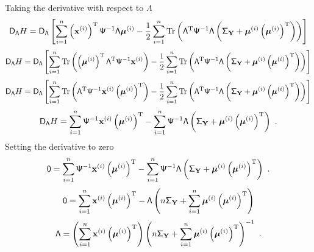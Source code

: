 \documentclass[12pt]{report}
\DeclareMathOperator{\trace}{Tr}
\newcommand{\T}{^\textup{T}}
\newcommand{\vect}[1]{\mathbf{#1}}
\newcommand{\vectGreek}[1]{\boldsymbol{#1}}
\newcommand{\matr}[1]{\mathsf{#1}}
\begin{document}
Taking the derivative with respect to $\matr{\Lambda}$
\begin{equation*}
\matr{D}_{\matr{\Lambda}}H=
\matr{D}_{\matr{\Lambda}}\left[
\sum_{i=1}^n\left(\vect{x}^{(i)}\right)\T\matr{\Psi}^{-1}\matr{\Lambda}\vectGreek{\mu}^{(i)}
-\frac{1}{2}\sum_{i=1}^{n}\trace\left(\matr{\Lambda}\T\matr{\Psi}^{-1}\matr{\Lambda}\left(\matr{\Sigma}_{\vect{Y}}+\vectGreek{\mu}^{(i)}\left(\vectGreek{\mu}^{(i)}\right)\T\right)\right)
\right]
\end{equation*}
\begin{equation*}
\matr{D}_{\matr{\Lambda}}H=
\matr{D}_{\matr{\Lambda}}\left[
\sum_{i=1}^n\trace\left(\left(\vectGreek{\mu}^{(i)}\right)\T\matr{\Lambda}\T\matr{\Psi}^{-1}\vect{x}^{(i)}\right)
-\frac{1}{2}\sum_{i=1}^{n}\trace\left(\matr{\Lambda}\T\matr{\Psi}^{-1}\matr{\Lambda}\left(\matr{\Sigma}_{\vect{Y}}+\vectGreek{\mu}^{(i)}\left(\vectGreek{\mu}^{(i)}\right)\T\right)\right)
\right]
\end{equation*}
\begin{equation*}
\matr{D}_{\matr{\Lambda}}H=
\matr{D}_{\matr{\Lambda}}\left[
\sum_{i=1}^n\trace\left(\matr{\Lambda}\T\matr{\Psi}^{-1}\vect{x}^{(i)}\left(\vectGreek{\mu}^{(i)}\right)\T\right)
-\frac{1}{2}\sum_{i=1}^{n}\trace\left(\matr{\Lambda}\T\matr{\Psi}^{-1}\matr{\Lambda}\left(\matr{\Sigma}_{\vect{Y}}+\vectGreek{\mu}^{(i)}\left(\vectGreek{\mu}^{(i)}\right)\T\right)\right)
\right]
\end{equation*}
\begin{equation*}
\matr{D}_{\matr{\Lambda}}H=
\sum_{i=1}^n\matr{\Psi}^{-1}\vect{x}^{(i)}\left(\vectGreek{\mu}^{(i)}\right)\T
-\sum_{i=1}^{n}\matr{\Psi}^{-1}\matr{\Lambda}\left(\matr{\Sigma}_{\vect{Y}}+\vectGreek{\mu}^{(i)}\left(\vectGreek{\mu}^{(i)}\right)\T\right) \ .
\end{equation*}
Setting the derivative to zero
\begin{equation*}
\matr{0}=
\sum_{i=1}^n\matr{\Psi}^{-1}\vect{x}^{(i)}\left(\vectGreek{\mu}^{(i)}\right)\T
-\sum_{i=1}^{n}\matr{\Psi}^{-1}\matr{\Lambda}\left(\matr{\Sigma}_{\vect{Y}}+\vectGreek{\mu}^{(i)}\left(\vectGreek{\mu}^{(i)}\right)\T\right) \ .
\end{equation*}
\begin{equation*}
\matr{0}=
\sum_{i=1}^n\vect{x}^{(i)}\left(\vectGreek{\mu}^{(i)}\right)\T
-\matr{\Lambda}\left(n\matr{\Sigma}_{\vect{Y}}+\sum_{i=1}^{n}\vectGreek{\mu}^{(i)}\left(\vectGreek{\mu}^{(i)}\right)\T\right)
\end{equation*}
\begin{equation}
\matr{\Lambda}
=
\left(\sum_{i=1}^n\vect{x}^{(i)}\left(\vectGreek{\mu}^{(i)}\right)\T\right)\left(n\matr{\Sigma}_{\vect{Y}}+\sum_{i=1}^{n}\vectGreek{\mu}^{(i)}\left(\vectGreek{\mu}^{(i)}\right)\T\right)^{-1}\ .
\end{equation}
\end{document}
